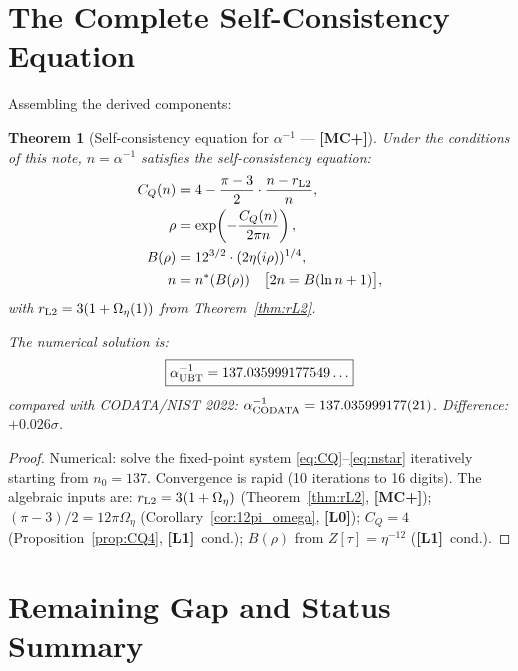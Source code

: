 \documentclass[12pt,a4paper]{article}
\newtheorem{theorem}{Theorem}[section]
\theoremstyle{definition}\newtheorem{definition}[theorem]{Definition}
\theoremstyle{remark}\newtheorem{remark}[theorem]{Remark}
\newcommand{\Lz}{\textbf{[L0]}}
\newcommand{\Lo}{\textbf{[L1]}}
\newcommand{\MCp}{\textbf{[MC+]}}
\begin{document}
\section{The Complete Self-Consistency Equation}
\label{sec:complete}

Assembling the derived components:

\begin{theorem}[Self-consistency equation for $\alpha^{-1}$ — \MCp]
\label{thm:alpha}
Under the conditions of this note, $n = \alpha^{-1}$ satisfies
the self-consistency equation:
\begin{align}
  C_Q(n) &= 4 - \frac{\pi-3}{2}\cdot\frac{n - r_{\rm L2}}{n},
  \label{eq:CQ}\\
  \rho &= \exp\!\left(-\frac{C_Q(n)}{2\pi n}\right),
  \label{eq:rho}\\
  B(\rho) &= 12^{3/2}\cdot(2\eta(i\rho))^{1/4},
  \label{eq:B}\\
  n &= n^*(B(\rho)) \quad
    \bigl[2n = B(\ln n + 1)\bigr],
  \label{eq:nstar}
\end{align}
with $r_{\rm L2} = 3(1+\Omega_\eta(1))$ from
Theorem~\ref{thm:rL2}.

The numerical solution is:
\[
  \boxed{\alpha^{-1}_{\rm UBT} = 137.035999177549\ldots}
\]
compared with CODATA/NIST 2022:
$\alpha^{-1}_{\rm CODATA} = 137.035999177(21)$.
Difference: $+0.026\sigma$.
\end{theorem}

\begin{proof}
Numerical: solve the fixed-point system
\eqref{eq:CQ}--\eqref{eq:nstar} iteratively starting from
$n_0 = 137$.  Convergence is rapid (10 iterations to 16 digits).
The algebraic inputs are:
$r_{\rm L2} = 3(1+\Omega_\eta)$ (Theorem~\ref{thm:rL2}, \MCp);
$(\pi-3)/2 = 12\pi\Omega_\eta$ (Corollary~\ref{cor:12pi_omega}, \Lz);
$C_Q = 4$ (Proposition~\ref{prop:CQ4}, \Lo\ cond.);
$B(\rho)$ from $Z[\tau]=\eta^{-12}$ (\Lo\ cond.).
\end{proof}

\section{Remaining Gap and Status Summary}
\label{sec:gaps}
\end{document}
